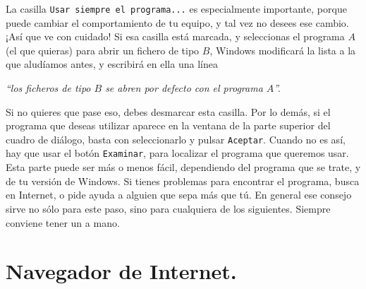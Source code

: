\documentclass[10pt,a4paper]{article}\usepackage[]{graphicx}\usepackage[]{color}
\newcounter {cont01}
\begin{document}
La casilla {\tt Usar siempre el programa...} es especialmente importante, porque puede cambiar el
comportamiento de tu equipo, y tal vez no desees ese cambio. ¡Así que ve con cuidado! Si esa
casilla está marcada, y seleccionas el programa $A$ (el que quieras) para abrir un fichero de tipo
$B$, Windows modificará la lista a la que aludíamos antes, y escribirá en ella una línea
\begin{center}
{\em ``los ficheros de tipo $B$ se abren por defecto con el programa $A$''.}
\end{center}
Si no quieres que pase eso, debes desmarcar esta casilla. Por lo demás, si el programa que deseas
utilizar aparece en la ventana de la parte superior del cuadro de diálogo, basta con seleccionarlo
y pulsar {\tt Aceptar}. Cuando no es así, hay que usar el botón {\tt Examinar}, para localizar el
programa que queremos usar. Esta parte puede ser más o menos fácil, dependiendo del programa que se
trate, y de tu versión de Windows. Si tienes problemas para encontrar el programa, busca en
Internet, o pide ayuda a alguien que sepa más que tú. En general ese consejo sirve no sólo para
este paso, sino para cualquiera de los siguientes. Siempre conviene tener un  a mano.

\section{Navegador de Internet.}
\label{tut00:sec:NavegadorInternet}
\end{document}
